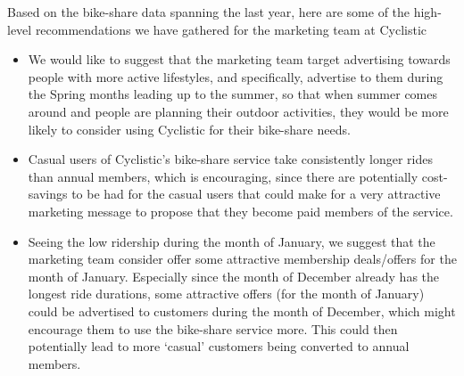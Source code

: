 \documentclass{article}
\begin{document}
Based on the bike-share data spanning the last year, here are some of the high-level recommendations we have gathered for the marketing team at Cyclistic
\begin{itemize}
\item We would like to suggest that the marketing team target advertising towards people with more active lifestyles, and specifically, advertise to them during the Spring months leading up to the summer, so that when summer comes around and people are planning their outdoor activities, they would be more likely to consider using Cyclistic for their bike-share needs.
\item Casual users of Cyclistic's bike-share service take consistently longer rides than annual members, which is encouraging, since there are potentially cost-savings to be had for the casual users that could make for a very attractive marketing message to propose that they become paid members of the service.
  \item Seeing the low ridership during the month of January, we suggest that the marketing team consider offer some attractive membership deals/offers for the month of January. Especially since the month of December already has the longest ride durations, some attractive offers (for the month of January) could be advertised to customers during the month of December, which might encourage them to use the bike-share service more. This could then potentially lead to more `casual' customers being converted to annual members.
\end{itemize}
\end{document}
